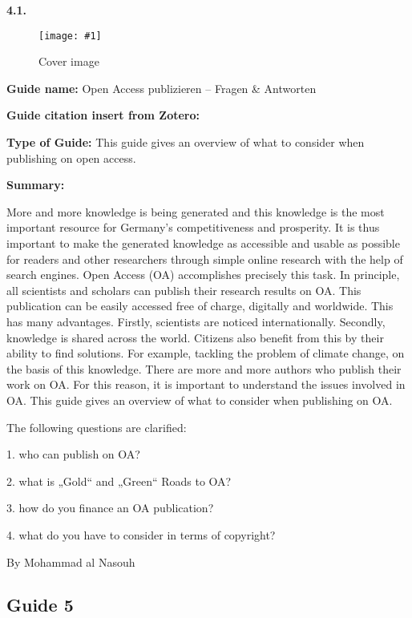 \documentclass{article}
\newlength{\imgwidth}
\newcommand\scaledgraphics[2]{%
                
\settowidth{\imgwidth}{\texttt{[image: \#1]}}%
                
\setlength{\imgwidth}{\minof{\imgwidth}{#2\textwidth}}%
                
\texttt{[image: \#1]}%
                
}
\begin{document}
\textbf{4.1.} 


\begin{center}
\begin{figure}
\scaledgraphics{d3486e9b-9c03-4ba9-9211-5ee2eb18125f.jpg}{0.5}
\caption*{Cover image}\label{F61436691}
\end{figure}


\end{center}


\textbf{Guide name:} Open Access publizieren – Fragen \& Antworten


\textbf{Guide citation insert from Zotero: }\autocite{bundesministerium_fur_bildung_und_forschung_open_2021}


\textbf{Type of Guide: } This guide gives an overview of what to consider when publishing on open access.


\textbf{Summary:}


More and more knowledge is being generated and this knowledge is the most important resource for Germany's competitiveness and prosperity. It is thus important to make the generated knowledge as accessible and usable as possible for readers and other researchers through simple online research with the help of search engines. Open Access (OA) accomplishes precisely this task. In principle, all scientists and scholars can publish their research results on OA. This publication can be easily accessed free of charge, digitally and worldwide. This has many advantages. Firstly, scientists are noticed internationally. Secondly, knowledge is shared across the world. Citizens also benefit from this by their ability to find solutions. For example, tackling the problem of climate change, on the basis of this knowledge. There are more and more authors who publish their work on OA. For this reason, it is important to understand the issues involved in OA. This guide gives an overview of what to consider when publishing on OA.


The following questions are clarified:


1. who can publish on OA?


2. what is „Gold“ and „Green“ Roads to OA?


3. how do you finance an OA publication?


4. what do you have to consider in terms of copyright?


By Mohammad al Nasouh 


\subsection{Guide 5}\label{H6691479}
\end{document}
